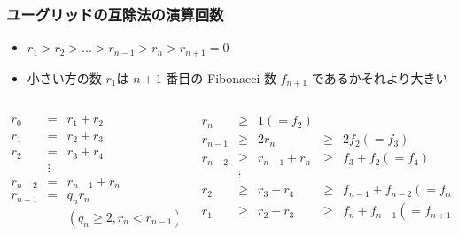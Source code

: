 \begin{frame}
\frametitle{ユーグリッドの互除法の演算回数}
  \begin{itemize}
\item \(r_1>r_2>\ldots>r_{n-1}>r_n>r_{n+1}=0\)
\item 小さい方の数 \(r_1\)は \(n+1\) 番目の Fibonacci 数 \(f_{n+1}\) であるかそれより大きい
  \end{itemize}
  \begin{columns}[t]
    \begin{column}{0.35\textwidth}
\centering
      \begin{math}
        \begin{array}{rcl}
r_0 &=& r_1 + r_2\\
r_1 &=& r_2 + r_3\\
r_2 &=& r_3 + r_4\\
&\vdots&\\
r_{n-2} &=& r_{n-1} + r_{n}\\
r_{n-1} &=& q_{n}r_{n}\\
         && (q_n\ge 2, r_n<r_{n-1})
        \end{array}
      \end{math}
    \end{column}
    \begin{column}{0.65\textwidth}
\centering
      \begin{math}
        \begin{array}{rclcl}
r_n     &\ge& 1(=f_2)\\
r_{n-1} &\ge&2r_n&\ge& 2f_2(=f_3)\\
r_{n-2} &\ge&r_{n-1}+r_{n}&\ge& f_3+f_2(=f_4)\\
 &\vdots& \\
r_{2} &\ge&r_{3}+r_{4}&\ge& f_{n-1}+f_{n-2}(=f_n)\\
r_{1} &\ge&r_{2}+r_{3}&\ge& f_n+f_{n-1}(=f_{n+1})\\
        \end{array}
      \end{math}
    \end{column}
  \end{columns}
\end{frame}

